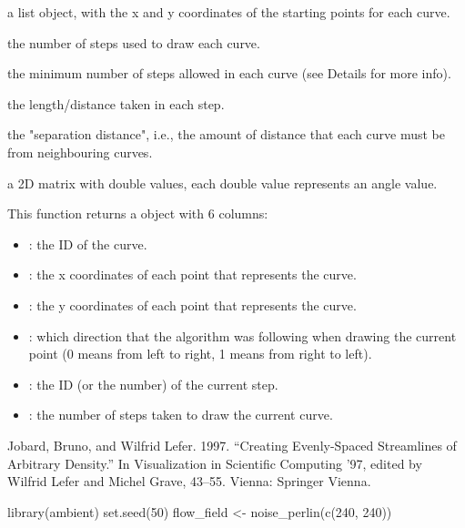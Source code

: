 \documentclass[a4paper]{book}
\begin{document}
%
\begin{Arguments}
\begin{ldescription}
\item[\code{starting\_points}] a list object, with the x and y coordinates of the starting points for each curve.

\item[\code{n\_steps}] the number of steps used to draw each curve.

\item[\code{min\_steps\_allowed}] the minimum number of steps allowed in each curve (see Details for more info).

\item[\code{step\_length}] the length/distance taken in each step.

\item[\code{d\_sep}] the "separation distance", i.e., the amount of distance that each curve must be from neighbouring curves.

\item[\code{flow\_field}] a 2D matrix with double values, each double value represents an angle value.
\end{ldescription}
\end{Arguments}
%
\begin{Value}
This function returns a  object with 6 columns:
\begin{itemize}

\item{} : the ID of the curve.
\item{} : the x coordinates of each point that represents the curve.
\item{} : the y coordinates of each point that represents the curve.
\item{} : which direction that the algorithm was following when drawing the current point (0 means from left to right, 1 means from right to left).
\item{} : the ID (or the number) of the current step.
\item{} : the number of steps taken to draw the current curve.

\end{itemize}

\end{Value}
%
\begin{References}
Jobard, Bruno, and Wilfrid Lefer. 1997. “Creating Evenly-Spaced Streamlines of Arbitrary Density.” In Visualization in Scientific Computing ’97, edited by Wilfrid Lefer and Michel Grave, 43–55. Vienna: Springer Vienna.
\end{References}
%
\begin{Examples}
\begin{ExampleCode}
library(ambient)
set.seed(50)
flow_field <- noise_perlin(c(240, 240))

\end{ExampleCode}
\end{Examples}
\printindex{}
\end{document}
